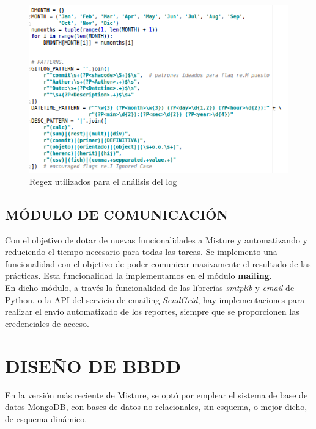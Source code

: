 \begin{figure}[H]
   \centering
   \includegraphics[width=16cm]{img/Selection_025_gitlog_patterns}
   \caption{Regex utilizados para el análisis del log}
   \label{figura:reg_analisis_log}
\end{figure}

\subsection{MÓDULO DE COMUNICACIÓN}

Con el objetivo de dotar de nuevas funcionalidades a Misture y automatizando y reduciendo el tiempo necesario para todas las tareas. Se implemento una funcionalidad con el objetivo de poder comunicar masivamente el resultado de las prácticas. Esta funcionalidad la implementamos en el módulo \textbf{mailing}.\\

En dicho módulo, a través la funcionalidad de las librerías \textit{smtplib} y \textit{email} de Python, o la API del servicio de emailing \textit{SendGrid}, hay implementaciones para realizar el envío automatizado de los reportes, siempre que se proporcionen las credenciales de acceso.


\section{DISEÑO DE BBDD} 
\label{subsec:bbdd}

En la versión más reciente de Misture, se optó por emplear el sistema de base de datos MongoDB, con bases de datos no relacionales, sin esquema, o mejor dicho, de esquema dinámico.\\



